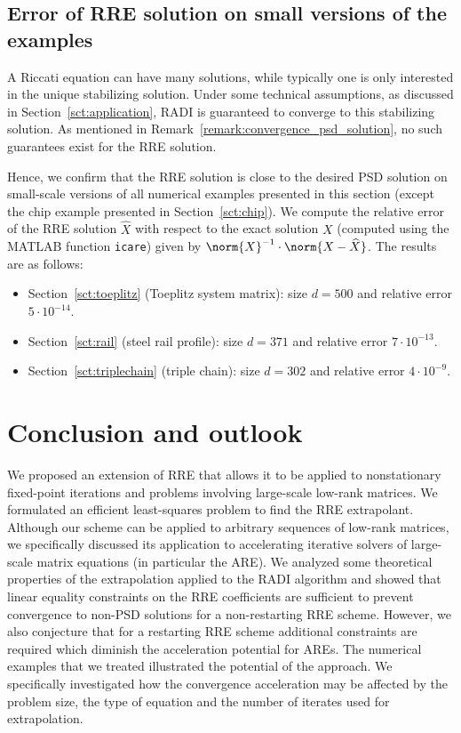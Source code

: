 \subsection{Error of RRE solution on small versions of the examples}
A Riccati equation can have many solutions, while typically one is only interested in the unique stabilizing solution.
Under some technical assumptions, as discussed in Section~\ref{sct:application}, RADI is guaranteed to converge to this stabilizing solution.
As mentioned in Remark~\ref{remark:convergence_psd_solution}, no such guarantees exist for the \ac{RRE} solution.

Hence, we confirm that the \ac{RRE} solution is close to the desired \ac{PSD} solution on small-scale versions of all numerical examples presented in this section (except the chip example presented in Section~\ref{sct:chip}).
We compute the relative error of the \ac{RRE} solution $\widehat{X}$ with respect to the exact solution $X$ (computed using the MATLAB function \texttt{icare}) given by $\norm{X}^{-1} \cdot \norm{ X - \widehat{X} }$.
The results are as follows:
\begin{itemize}
	\item Section~\ref{sct:toeplitz} (Toeplitz system matrix): size $d = 500$ and relative error $5 \cdot 10^{-14}$.
	\item Section~\ref{sct:rail} (steel rail profile): size $d = 371$ and relative error $7 \cdot 10^{-13}$.
	\item Section~\ref{sct:triplechain} (triple chain): size $d = 302$ and relative error $4 \cdot 10^{-9}$.
\end{itemize}

\section{Conclusion and outlook}\label{sct:conclusion}
We proposed an extension of \ac{RRE} that allows it to be applied to nonstationary fixed-point iterations and problems involving large-scale low-rank matrices.
We formulated an efficient least-squares problem to find the \ac{RRE} extrapolant.
Although our scheme can be applied to arbitrary sequences of low-rank matrices, we specifically discussed its application to accelerating iterative solvers of large-scale matrix equations (in particular the \ac{ARE}).
We analyzed some theoretical properties of the extrapolation applied to the RADI algorithm and showed that linear equality constraints on the \ac{RRE} coefficients are sufficient to prevent convergence to non-\ac{PSD} solutions for a non-restarting \ac{RRE} scheme.
However, we also conjecture that for a restarting \ac{RRE} scheme additional constraints are required which diminish the acceleration potential for \acp{ARE}.
The numerical examples that we treated illustrated the potential of the approach.
We specifically investigated how the convergence acceleration may be affected by the problem size, the type of equation and the number of iterates used for extrapolation.

